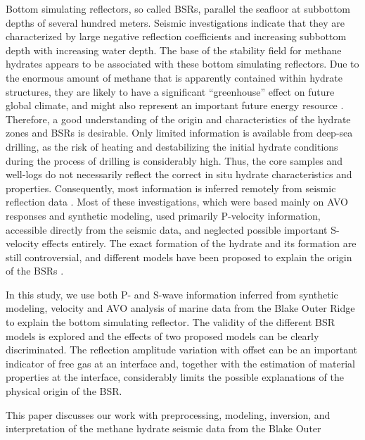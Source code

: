 Bottom simulating reflectors, so called BSRs, parallel the seafloor at subbottom depths
of several hundred meters. Seismic investigations \cite[]{Shipley.aapetgeo.63,Miller.aapetgeo.75,Hyndman2.jgr.97}
indicate that they are 
characterized by large negative reflection coefficients and increasing subbottom
depth with increasing water depth. The base of the stability field for 
methane hydrates appears to be associated with these bottom simulating 
reflectors. Due to the enormous 
amount of methane that is apparently contained within hydrate structures, they
are likely to have a significant ``greenhouse'' effect on future global climate,
and might also represent an important future energy resource 
\cite[]{Kvenvolden.revgeo.31}. Therefore, a good understanding of the origin and
characteristics of the hydrate zones and BSRs is desirable.
Only limited information is available from deep-sea drilling, as the 
risk of heating and destabilizing the initial hydrate conditions during the 
process of drilling is considerably high. Thus, the core samples and well-logs
do not necessarily reflect the correct in situ 
hydrate characteristics and properties.
Consequently, most information is inferred remotely from seismic reflection
data \cite[]{Shipley.aapetgeo.63,Miller.aapetgeo.75,Hyndman.jgr.97,Hyndman2.jgr.97,Singh.science.260}. Most of these investigations, which were 
based mainly 
on AVO responses and synthetic modeling, used primarily P-velocity information,
accessible directly from the seismic data, and neglected possible important 
S-velocity effects entirely.
The exact formation of the hydrate and its formation are still 
controversial, and different models have been proposed to explain the origin
of the BSRs \cite[]{Kvenvolden.aapetgeo.34,Hyndman.jgr.97}.
\par
In this study, we use both P- and S-wave information inferred from synthetic
modeling, velocity and AVO analysis of marine data from 
the Blake Outer Ridge to 
explain the bottom simulating reflector. The validity of the different 
BSR models is explored and the effects of two proposed models can be clearly
discriminated. The reflection amplitude variation with offset can 
be an important indicator of 
free gas at an interface \cite[]{Shuey.geophys.50} and, together with the
estimation of material properties at the interface, considerably 
limits the possible 
explanations of the physical origin of the BSR.
\par
This paper discusses our work with preprocessing, modeling, inversion, and 
interpretation of the methane hydrate seismic data from the Blake Outer
